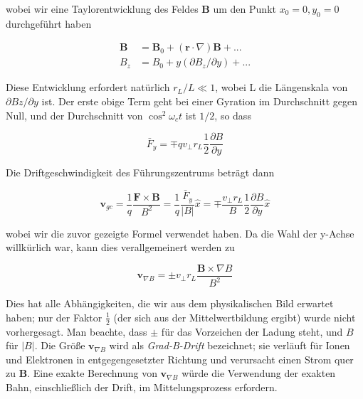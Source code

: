 \documentclass[
  a4paper,
  DIV=11]{scrreprt}
\begin{document}
wobei wir eine Taylorentwicklung des Feldes \(\mathbf{B}\) um den Punkt
\(x_0=0, y_0=0\) durchgeführt haben

\[
\begin{aligned}
\mathbf{B} &= \mathbf{B}_0 + (\mathbf{r}\cdot\nabla)\mathbf{B} + ... \\
B_z &= B_0 + y(\partial B_z/\partial y) + ...
\end{aligned}
\]

Diese Entwicklung erfordert natürlich \(r_L / L \ll 1\), wobei L die
Längenskala von \(\partial Bz/\partial y\) ist. Der erste obige Term
geht bei einer Gyration im Durchschnitt gegen Null, und der Durchschnitt
von \(\cos^2 \omega_c t\) ist \(1/2\), so dass

\[
\bar{F}_y = \mp q v_\perp r_L \frac{1}{2}\frac{\partial B}{\partial y}
\]

Die Driftgeschwindigkeit des Führungszentrums beträgt dann

\[
\mathbf{v}_{gc} = \frac{1}{q}\frac{\mathbf{F}\times\mathbf{B}}{B^2} = \frac{1}{q}\frac{\bar{F}_y}{|B|}\widehat{x} = \mp \frac{v_\perp r_L}{B}\frac{1}{2} \frac{\partial B}{\partial y} \widehat{x}
\]

wobei wir die zuvor gezeigte Formel verwendet haben. Da die Wahl der
y-Achse willkürlich war, kann dies verallgemeinert werden zu

\[
\mathbf{v}_{\nabla B} = \pm v_\perp r_L \frac{\mathbf{B}\times \nabla B}{B^2}
\]

Dies hat alle Abhängigkeiten, die wir aus dem physikalischen Bild
erwartet haben; nur der Faktor \(\frac{1}{2}\) (der sich aus der
Mittelwertbildung ergibt) wurde nicht vorhergesagt. Man beachte, dass
\(\pm\) für das Vorzeichen der Ladung steht, und \(B\) für \(|B|\). Die
Größe \(\mathbf{v}_{\nabla B}\) wird als \emph{Grad-B-Drift} bezeichnet;
sie verläuft für Ionen und Elektronen in entgegengesetzter Richtung und
verursacht einen Strom quer zu \(\mathbf{B}\). Eine exakte Berechnung
von \(\mathbf{v}_{\nabla B}\) würde die Verwendung der exakten Bahn,
einschließlich der Drift, im Mittelungsprozess erfordern.
\end{document}
